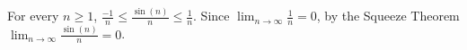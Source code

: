 For every $n \geq 1$, $\frac{-1}{n} \leq \frac{\sin(n)}{n} \leq \frac{1}{n}$.
Since $\lim_{n \to \infty} \frac{1}{n} = 0$, by the Squeeze Theorem $\lim_{n \to \infty} \frac{\sin(n)}{n} = 0$.